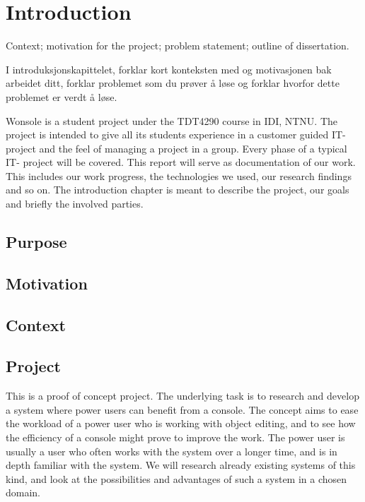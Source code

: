 \chapter{Introduction}

\minitoc
\setcounter{page}{1}

Context;  motivation  for the project;  problem statement;  outline of
dissertation.

I introduksjonskapittelet, forklar kort
konteksten med og motivasjonen bak arbeidet
ditt, forklar problemet som du prøver å løse og
forklar hvorfor dette problemet er verdt å løse.


Wonsole is a student project under the TDT4290 course in IDI, NTNU. The project is intended to give all its students experience in a customer guided IT- project and the feel of managing a project in a group. Every phase of a typical IT- project will be covered. This report will serve as documentation of our work. This includes our work progress, the technologies we used, our research findings and so on. The introduction chapter is meant to describe the project, our goals and briefly the involved parties.

\clearpage


\section{Purpose}
\section{Motivation}
\section{Context}

\section{Project}
This is a proof of concept project. The underlying task is to research and develop a system where power users can benefit from a console.  The concept aims to ease the workload of a power user who is working with object editing, and to see how the efficiency of a console might prove to improve the work. The power user is usually a user who often works with the system over a longer time, and is in depth familiar with the system. We will research already existing systems of this kind, and look at the possibilities and advantages of such a system in a chosen domain.

